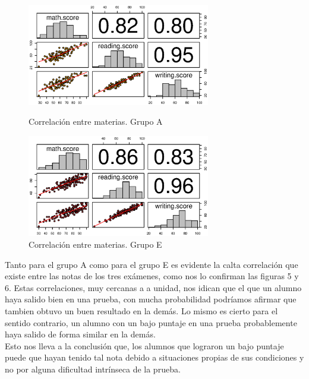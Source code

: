 \documentclass{article}
\begin{document}
    \begin{figure}[ht]
        \begin{minipage}[b]{0.45\linewidth}
            \includegraphics[width=8cm]{Output/Plots/5CorrgrupoA.eps}
            \vspace*{-8.5mm}
            \caption{Correlaci\'on entre materias. Grupo A}
            \label{fig:minipage1}
        \end{minipage}
        \hspace{0.2cm}
        \begin{minipage}[b]{0.45\linewidth}
            \includegraphics[width=8cm]{Output/Plots/6CorrelaciongrupoE.eps}
            \vspace*{-9mm}
            \caption{Correlaci\'on entre materias. Grupo E}
            \label{fig:minipage2}
        \end{minipage}
    \end{figure}

    Tanto para el grupo A como para el grupo E es evidente la calta correlaci\'on que existe entre las notas de los tres ex\'amenes,
     como nos lo confirman las figuras 5 y 6. Estas correlaciones, muy cercanas a a unidad, nos idican que el que un alumno haya salido
     bien en una prueba, con mucha probabilidad podr\'iamos afirmar que tambien obtuvo un buen resultado en la dem\'as. Lo mismo
     es cierto para el sentido contrario, un alumno con un bajo puntaje en una prueba probablemente haya salido de forma similar en la dem\'as.\\

     Esto nos lleva a la conclusi\'on que, los alumnos que lograron un bajo puntaje puede que hayan tenido tal nota debido a
     situaciones propias de sus condiciones y no por alguna dificultad intr\'inseca de la prueba.
\end{document}
